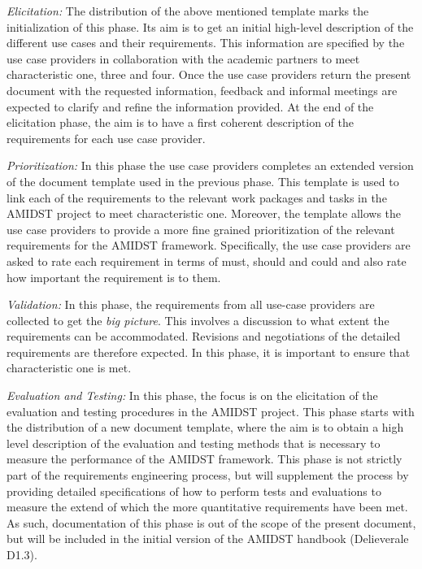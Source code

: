 \emph{Elicitation:} The distribution of the above mentioned template marks the initialization of this phase.  Its aim is to get an initial high-level description of the different use cases and their requirements. This information are specified by the use case providers in collaboration with the academic partners to meet characteristic one, three and four.  Once the use case providers return the present document with the requested information, feedback and informal meetings are expected to clarify and refine the information provided.  At the end of the elicitation phase, the aim is to have a first coherent description of the requirements for each use case provider.

 \emph{Prioritization:} In this phase the use case providers completes an extended version of the document template used in the previous phase. This template is used to link each of the requirements to the relevant work packages and tasks in the AMIDST project to meet characteristic one. Moreover, the template allows the use case providers to provide a more fine grained prioritization of the relevant requirements for the AMIDST framework.  Specifically, the use case providers are asked to rate each requirement in terms of must, should and could and also rate how important the requirement is to them.  

\emph{Validation:} In this phase, the requirements from all use-case providers are collected to get the \emph{big picture}.  This involves a discussion to what extent the requirements can be accommodated. Revisions and negotiations of the detailed requirements are therefore expected.  In this phase, it is important to ensure that characteristic one is met.

 \emph{Evaluation and Testing:} In this phase, the focus is on the elicitation of the evaluation and testing procedures
 in the AMIDST project. This phase starts with the distribution of a new document template, where the aim is to obtain a
 high level description of the evaluation and testing methods that is necessary to measure the performance of the AMIDST
 framework. This phase is not strictly part of the requirements engineering process, but will supplement the process by providing
 detailed specifications of how to perform tests and evaluations to measure the extend of which the more quantitative
 requirements have been met. As such, documentation of this phase is out of the scope of the present document, but will
 be included in the initial version of the AMIDST handbook (Delieverale D1.3).    


